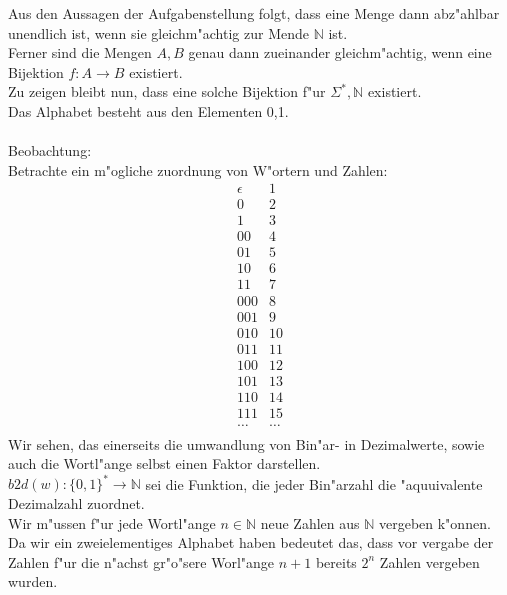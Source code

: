 \documentclass{article}
\newcommand{\ra}{\rightarrow}
\newcommand{\eps}{\epsilon}
\begin{document}
\subsubsection{}
Aus den Aussagen der Aufgabenstellung folgt, dass eine Menge dann abz"ahlbar
    unendlich ist, wenn sie gleichm"achtig zur Mende $\mathbb{N}$ ist.\\
Ferner sind die Mengen $A, B$ genau dann zueinander gleichm"achtig, wenn eine
    Bijektion $f: A \ra B$ existiert.\\
Zu zeigen bleibt nun, dass eine solche Bijektion f"ur $\Sigma^*, \mathbb{N}$
    existiert.\\
Das Alphabet besteht aus den Elementen 0,1.\\
\\
Beobachtung:\\
Betrachte ein m"ogliche zuordnung von W"ortern und Zahlen:\[
    \begin{array}{ll}
        \eps    &1\\
        0       &2\\
        1       &3\\
        00      &4\\
        01      &5\\
        10      &6\\
        11      &7\\
        000     &8\\
        001     &9\\
        010     &10\\
        011     &11\\
        100     &12\\
        101     &13\\
        110     &14\\
        111     &15\\
        \ldots  &\ldots\\
    \end{array}
    \]
Wir sehen, das einerseits die umwandlung von Bin"ar- in Dezimalwerte, sowie
    auch die Wortl"ange selbst einen Faktor darstellen.\\
$b2d(w): \{0,1\}^* \ra \mathbb{N}$ sei die Funktion, die jeder Bin"arzahl die
    "aquuivalente Dezimalzahl zuordnet.\\
Wir m"ussen f"ur jede Wortl"ange $n \in \mathbb{N}$ neue Zahlen aus $\mathbb{N}$
    vergeben k"onnen. Da wir ein zweielementiges Alphabet haben bedeutet das,
    dass vor vergabe der Zahlen f"ur die n"achst gr"o"sere 
    Worl"ange $n+1$ bereits $2^n$ Zahlen vergeben wurden.
\end{document}
